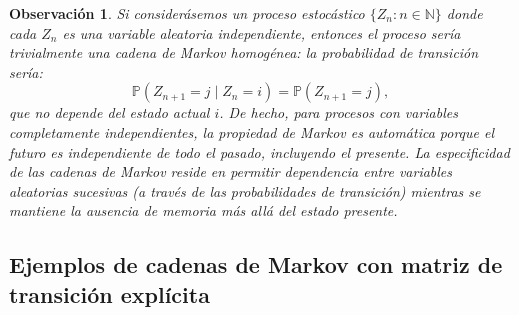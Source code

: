 \documentclass[12pt]{book}
\newtheorem{remark}{Observación}[chapter]
\begin{document}
\begin{remark}
Si considerásemos un proceso estocástico $\{Z_n : n \in \mathbb{N}\}$ donde cada $Z_n$ es una variable aleatoria independiente, entonces el proceso sería trivialmente una cadena de Markov homogénea: la probabilidad de transición sería:
\[
\mathbb{P}(Z_{n+1} = j \mid Z_n = i) = \mathbb{P}(Z_{n+1} = j),
\]
que no depende del estado actual $i$. De hecho, para procesos con variables completamente independientes, la propiedad de Markov es automática porque el futuro es independiente de todo el pasado, incluyendo el presente. La especificidad de las cadenas de Markov reside en permitir dependencia entre variables aleatorias sucesivas (a través de las probabilidades de transición) mientras se mantiene la ausencia de memoria más allá del estado presente.
\end{remark}

\subsection*{Ejemplos de cadenas de Markov con matriz de transición explícita}
\end{document}
